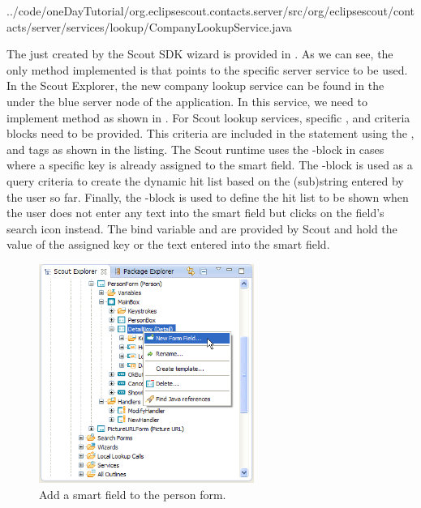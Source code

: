\documentclass[a4paper,10pt,twoside]{book}
\begin{document}

{../code/oneDayTutorial/org.eclipsescout.contacts.server/src/org/eclipsescout/contacts/server/services/lookup/CompanyLookupService.java}

The  just created by the Scout SDK wizard is provided in . 
As we can see, the only method implemented is  that points to the specific server service to be used. 
In the Scout Explorer, the new company lookup service can be found in the  under the blue server node of the application. 
In this service, we need to implement method  as shown in . 
For Scout lookup services, specific ,  and  criteria blocks need to be provided. 
This criteria are included in the  statement using the ,  and  tags as shown in the listing. 
The Scout runtime uses the -block in cases where a specific key is already assigned to the smart field. 
The -block is used as a query criteria to create the dynamic  hit list based on the (sub)string entered by the user so far.
Finally, the -block is used to define the hit list to be shown when the user does not enter any text into the smart field but clicks on the field's search icon instead. 
The bind variable  and  are provided by Scout and hold the value of the assigned key or the text entered into the smart field. 

\begin{figure}
\includegraphics[width=7cm]{new_smartfield_company_contextmenu.png}
\caption{Add a smart field to the person form.}
\end{figure}
\end{document}
